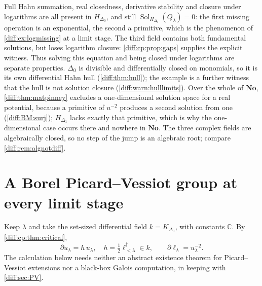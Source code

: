 \documentclass[11pt,letterpaper]{article}
\numberwithin{equation}{section}
\theoremstyle{definition}
\theoremstyle{remark}
\newcommand{\No}{\mathbf{No}}
\newcommand{\C}{\mathbb C}
\newcommand{\der}{\partial}
\newcommand{\Sol}{\operatorname{Sol}}
\begin{document}
\begin{remark}
\label{diff:cp:rem:workspaces}
Full Hahn summation, real closedness, derivative stability and closure under
logarithms are all present in $H_{\Delta_{0}}$, and still
$\Sol_{H_{\Delta_{0}}}(Q_{\lambda})=0$: the first missing operation is an
exponential, the second a primitive, which is the phenomenon of
\cref{diff:ex:logmissing} at a limit stage. The third field
contains both fundamental solutions, but loses logarithm closure:
\cref{diff:cp:prop:gaps} supplies the explicit witness. Thus
solving this equation and being closed under logarithms are
separate properties. $\Delta_{0}$ is divisible and
differentially closed on monomials, so it is its own differential Hahn hull
(\cref{diff:thm:hull}); the example is a further witness that the hull is not
solution closure (\cref{diff:warn:hulllimits}). Over the whole of $\No$,
\cref{diff:thm:matpinney} excludes a one-dimensional solution space for a real
potential, because a primitive of $u^{-2}$ produces a second solution from one
(\ref{diff:BM:surj}); $H_{\Delta_{1}}$ lacks exactly that primitive, which is
why the one-dimensional case occurs there and nowhere in $\No$. The three
complex fields are algebraically closed, so no step of the jump is an
algebraic root; compare \cref{diff:rem:algnotdiff}.
\end{remark}

\section{A Borel Picard--Vessiot group at every limit stage}
\label{diff:cp:sec:pv}

Keep $\lambda$ and take the set-sized differential field $k=K_{\Delta_{0}}$, with
constants $\C$. By \cref{diff:cp:thm:critical},
\begin{equation}\label{diff:cp:eq:pvder}
 \der u_{\lambda}=h\,u_{\lambda},\quad h=\tfrac12\ell_{<\lambda}^{\dagger}\in k,
 \qquad
 \der\ell_{\lambda}=u_{\lambda}^{-2}.
\end{equation}
The calculation below needs neither an abstract existence theorem for
Picard--Vessiot extensions nor a black-box Galois computation, in keeping with
\cref{diff:sec:PV}.
\end{document}
